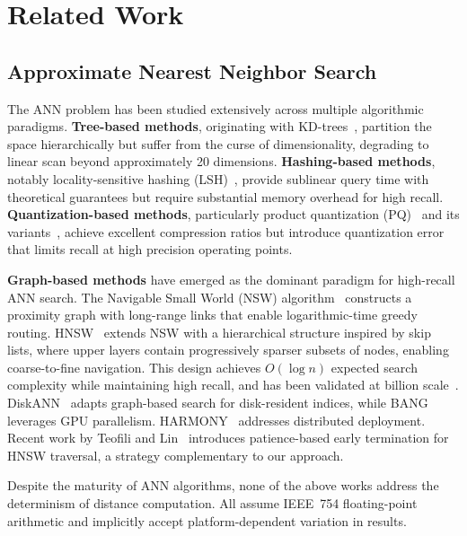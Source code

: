 \documentclass[10pt,journal,compsoc]{IEEEtran}
\newcommand{\hnsw}{\textsc{HNSW}}
\begin{document}
\section{Related Work}
\label{sec:related}

\subsection{Approximate Nearest Neighbor Search}

The ANN problem has been studied extensively across multiple algorithmic paradigms. \textbf{Tree-based methods}, originating with KD-trees~\cite{bentley1975kdtree}, partition the space hierarchically but suffer from the curse of dimensionality, degrading to linear scan beyond approximately 20 dimensions. \textbf{Hashing-based methods}, notably locality-sensitive hashing (LSH)~\cite{gionis1999lsh}, provide sublinear query time with theoretical guarantees but require substantial memory overhead for high recall. \textbf{Quantization-based methods}, particularly product quantization (PQ)~\cite{jegou2011pq} and its variants~\cite{baranchuk2018revisiting}, achieve excellent compression ratios but introduce quantization error that limits recall at high precision operating points.

\textbf{Graph-based methods} have emerged as the dominant paradigm for high-recall ANN search. The Navigable Small World (NSW) algorithm~\cite{malkov2014nsw} constructs a proximity graph with long-range links that enable logarithmic-time greedy routing. \hnsw{}~\cite{malkov2020hnsw} extends NSW with a hierarchical structure inspired by skip lists, where upper layers contain progressively sparser subsets of nodes, enabling coarse-to-fine navigation. This design achieves $O(\log n)$ expected search complexity while maintaining high recall, and has been validated at billion scale~\cite{simhadri2022neurips}. DiskANN~\cite{subramanya2019diskann} adapts graph-based search for disk-resident indices, while BANG~\cite{karthik2024bang} leverages GPU parallelism. HARMONY~\cite{xu2025harmony} addresses distributed deployment. Recent work by Teofili and Lin~\cite{teofili2025patience} introduces patience-based early termination for \hnsw{} traversal, a strategy complementary to our approach.

Despite the maturity of ANN algorithms, none of the above works address the determinism of distance computation. All assume IEEE~754 floating-point arithmetic and implicitly accept platform-dependent variation in results.
\end{document}

